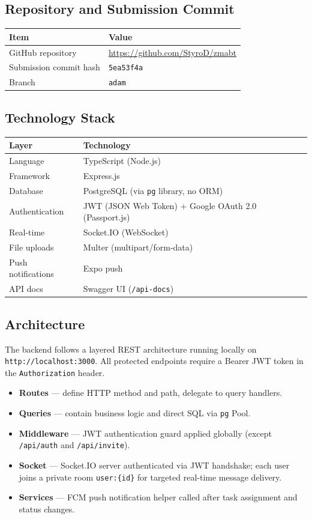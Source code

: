 \documentclass[12pt,a4paper]{article}
\begin{document}
\subsection{Repository and Submission Commit}

\begin{tabular}{ll}
\toprule
\textbf{Item} & \textbf{Value} \\
\midrule
GitHub repository & \url{https://github.com/StyroD/zmabt} \\
Submission commit hash & \texttt{5ea53f4a} \\
Branch & \texttt{adam} \\
\bottomrule
\end{tabular}

\subsection{Technology Stack}

\begin{tabular}{ll}
\toprule
\textbf{Layer} & \textbf{Technology} \\
\midrule
Language          & TypeScript (Node.js) \\
Framework         & Express.js \\
Database          & PostgreSQL (via \texttt{pg} library, no ORM) \\
Authentication    & JWT (JSON Web Token) + Google OAuth 2.0 (Passport.js) \\
Real-time         & Socket.IO (WebSocket) \\
File uploads      & Multer (multipart/form-data) \\
Push notifications & Expo push \\
API docs          & Swagger UI (\texttt{/api-docs}) \\
\bottomrule
\end{tabular}

\subsection{Architecture}

The backend follows a layered REST architecture running locally on \texttt{http://localhost:3000}. All protected endpoints require a Bearer JWT token in the \texttt{Authorization} header.

\begin{itemize}[noitemsep]
    \item \textbf{Routes} --- define HTTP method and path, delegate to query handlers.
    \item \textbf{Queries} --- contain business logic and direct SQL via \texttt{pg} Pool.
    \item \textbf{Middleware} --- JWT authentication guard applied globally (except \texttt{/api/auth} and \texttt{/api/invite}).
    \item \textbf{Socket} --- Socket.IO server authenticated via JWT handshake; each user joins a private room \texttt{user:\{id\}} for targeted real-time message delivery.
    \item \textbf{Services} --- FCM push notification helper called after task assignment and status changes.
\end{itemize}
\end{document}
